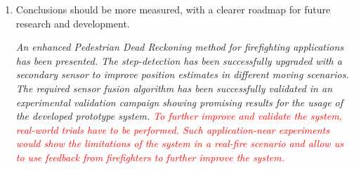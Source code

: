 \documentclass{article}
\begin{document}
\begin{enumerate}
\item Conclusions should be more measured, with a clearer roadmap for future research and development.

\textit{An enhanced Pedestrian Dead Reckoning method for firefighting applications has been presented. The step-detection  has been successfully upgraded with a secondary sensor to improve  position estimates in different moving scenarios. The required sensor fusion algorithm has been successfully  validated in an experimental validation campaign showing promising results for the usage of the developed prototype system. \textcolor{red}{To further improve and validate the system, real-world trials have to be performed. Such application-near experiments would show the limitations of the system in a real-fire scenario and allow us to use feedback from firefighters to further improve the system.}}



\end{enumerate}



%
%
\end{document}
